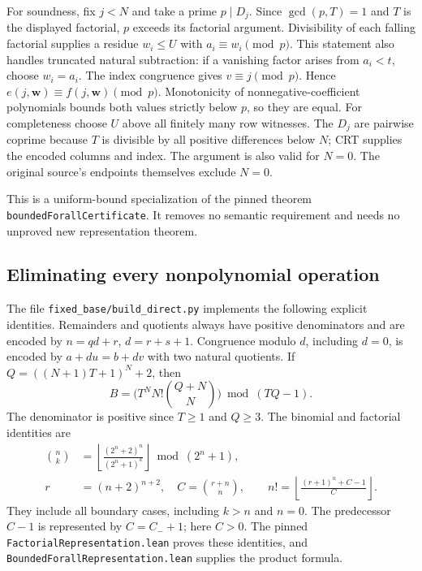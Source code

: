 For soundness, fix $j<N$ and take a prime $p\mid D_j$. Since
$\gcd(p,T)=1$ and $T$ is the displayed factorial, $p$ exceeds its factorial
argument. Divisibility of each falling factorial supplies a residue
$w_i\leq U$ with $a_i\equiv w_i\pmod p$. This statement also handles
truncated natural subtraction: if a vanishing factor arises from
$a_i<t$, choose $w_i=a_i$. The index congruence gives $v\equiv j\pmod p$.
Hence $e(j,\boldsymbol w)\equiv f(j,\boldsymbol w)\pmod p$.
Monotonicity of nonnegative-coefficient polynomials bounds both values
strictly below $p$, so they are equal. For completeness choose $U$ above
all finitely many row witnesses. The $D_j$ are pairwise coprime because
$T$ is divisible by all positive differences below $N$; CRT supplies the
encoded columns and index. The argument is also valid for $N=0$.
The original source's endpoints themselves exclude $N=0$.

This is a uniform-bound specialization of the pinned theorem
\texttt{boundedForallCertificate}. It removes no semantic requirement and
needs no unproved new representation theorem.

\subsection{Eliminating every nonpolynomial operation}

The file \texttt{fixed\_base/build\_direct.py} implements the following explicit
identities. Remainders and quotients always have positive denominators
and are encoded by $n=qd+r$, $d=r+s+1$. Congruence modulo $d$, including
$d=0$, is encoded by $a+du=b+dv$ with two natural quotients. If
$Q=((N+1)T+1)^N+2$, then
\[
 B=\bigl(T^N N!\binom{Q+N}{N}\bigr)\bmod(TQ-1).
\]
The denominator is positive since $T\geq1$ and $Q\geq3$.
The binomial and factorial identities are
\begin{align*}
 \binom nk&=\left\lfloor\frac{(2^n+2)^n}{(2^n+1)^k}\right\rfloor
                \bmod(2^n+1),\\
 r&=(n+2)^{n+2},\quad C=\binom{r+n}{n},\qquad
 n!=\left\lfloor\frac{(r+1)^n+C-1}{C}\right\rfloor.
\end{align*}
They include all boundary cases, including $k>n$ and $n=0$.
The predecessor $C-1$ is represented by $C=C_-+1$; here $C>0$.
The pinned \texttt{FactorialRepresentation.lean} proves these identities,
and \texttt{BoundedForallRepresentation.lean} supplies the product formula.

